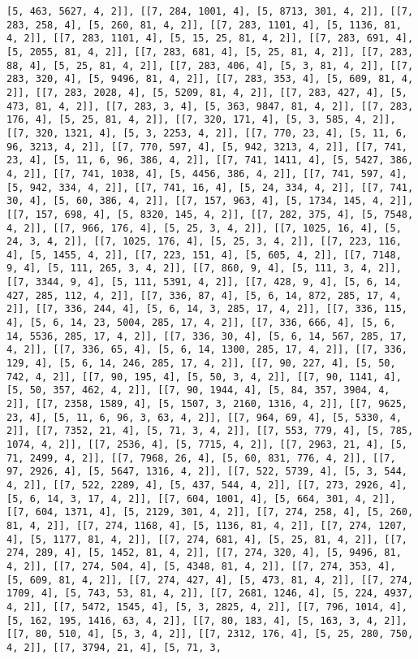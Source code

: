 \documentclass[12pt,fleqn]{article}\usepackage{../../common}
\begin{document}
\begin{verbatim}
[5, 463, 5627, 4, 2]], [[7, 284, 1001, 4], [5, 8713, 301, 4, 2]], [[7, 283, 258, 4], [5, 260, 81, 4, 2]], [[7, 283, 1101, 4], [5, 1136, 81, 4, 2]], [[7, 283, 1101, 4], [5, 15, 25, 81, 4, 2]], [[7, 283, 691, 4], [5, 2055, 81, 4, 2]], [[7, 283, 681, 4], [5, 25, 81, 4, 2]], [[7, 283, 88, 4], [5, 25, 81, 4, 2]], [[7, 283, 406, 4], [5, 3, 81, 4, 2]], [[7, 283, 320, 4], [5, 9496, 81, 4, 2]], [[7, 283, 353, 4], [5, 609, 81, 4, 2]], [[7, 283, 2028, 4], [5, 5209, 81, 4, 2]], [[7, 283, 427, 4], [5, 473, 81, 4, 2]], [[7, 283, 3, 4], [5, 363, 9847, 81, 4, 2]], [[7, 283, 176, 4], [5, 25, 81, 4, 2]], [[7, 320, 171, 4], [5, 3, 585, 4, 2]], [[7, 320, 1321, 4], [5, 3, 2253, 4, 2]], [[7, 770, 23, 4], [5, 11, 6, 96, 3213, 4, 2]], [[7, 770, 597, 4], [5, 942, 3213, 4, 2]], [[7, 741, 23, 4], [5, 11, 6, 96, 386, 4, 2]], [[7, 741, 1411, 4], [5, 5427, 386, 4, 2]], [[7, 741, 1038, 4], [5, 4456, 386, 4, 2]], [[7, 741, 597, 4], [5, 942, 334, 4, 2]], [[7, 741, 16, 4], [5, 24, 334, 4, 2]], [[7, 741, 30, 4], [5, 60, 386, 4, 2]], [[7, 157, 963, 4], [5, 1734, 145, 4, 2]], [[7, 157, 698, 4], [5, 8320, 145, 4, 2]], [[7, 282, 375, 4], [5, 7548, 4, 2]], [[7, 966, 176, 4], [5, 25, 3, 4, 2]], [[7, 1025, 16, 4], [5, 24, 3, 4, 2]], [[7, 1025, 176, 4], [5, 25, 3, 4, 2]], [[7, 223, 116, 4], [5, 1455, 4, 2]], [[7, 223, 151, 4], [5, 605, 4, 2]], [[7, 7148, 9, 4], [5, 111, 265, 3, 4, 2]], [[7, 860, 9, 4], [5, 111, 3, 4, 2]], [[7, 3344, 9, 4], [5, 111, 5391, 4, 2]], [[7, 428, 9, 4], [5, 6, 14, 427, 285, 112, 4, 2]], [[7, 336, 87, 4], [5, 6, 14, 872, 285, 17, 4, 2]], [[7, 336, 244, 4], [5, 6, 14, 3, 285, 17, 4, 2]], [[7, 336, 115, 4], [5, 6, 14, 23, 5004, 285, 17, 4, 2]], [[7, 336, 666, 4], [5, 6, 14, 5536, 285, 17, 4, 2]], [[7, 336, 30, 4], [5, 6, 14, 567, 285, 17, 4, 2]], [[7, 336, 65, 4], [5, 6, 14, 1300, 285, 17, 4, 2]], [[7, 336, 129, 4], [5, 6, 14, 246, 285, 17, 4, 2]], [[7, 90, 227, 4], [5, 50, 742, 4, 2]], [[7, 90, 195, 4], [5, 50, 3, 4, 2]], [[7, 90, 1141, 4], [5, 50, 357, 462, 4, 2]], [[7, 90, 1944, 4], [5, 84, 357, 3904, 4, 2]], [[7, 2358, 1589, 4], [5, 1507, 3, 2160, 1316, 4, 2]], [[7, 9625, 23, 4], [5, 11, 6, 96, 3, 63, 4, 2]], [[7, 964, 69, 4], [5, 5330, 4, 2]], [[7, 7352, 21, 4], [5, 71, 3, 4, 2]], [[7, 553, 779, 4], [5, 785, 1074, 4, 2]], [[7, 2536, 4], [5, 7715, 4, 2]], [[7, 2963, 21, 4], [5, 71, 2499, 4, 2]], [[7, 7968, 26, 4], [5, 60, 831, 776, 4, 2]], [[7, 97, 2926, 4], [5, 5647, 1316, 4, 2]], [[7, 522, 5739, 4], [5, 3, 544, 4, 2]], [[7, 522, 2289, 4], [5, 437, 544, 4, 2]], [[7, 273, 2926, 4], [5, 6, 14, 3, 17, 4, 2]], [[7, 604, 1001, 4], [5, 664, 301, 4, 2]], [[7, 604, 1371, 4], [5, 2129, 301, 4, 2]], [[7, 274, 258, 4], [5, 260, 81, 4, 2]], [[7, 274, 1168, 4], [5, 1136, 81, 4, 2]], [[7, 274, 1207, 4], [5, 1177, 81, 4, 2]], [[7, 274, 681, 4], [5, 25, 81, 4, 2]], [[7, 274, 289, 4], [5, 1452, 81, 4, 2]], [[7, 274, 320, 4], [5, 9496, 81, 4, 2]], [[7, 274, 504, 4], [5, 4348, 81, 4, 2]], [[7, 274, 353, 4], [5, 609, 81, 4, 2]], [[7, 274, 427, 4], [5, 473, 81, 4, 2]], [[7, 274, 1709, 4], [5, 743, 53, 81, 4, 2]], [[7, 2681, 1246, 4], [5, 224, 4937, 4, 2]], [[7, 5472, 1545, 4], [5, 3, 2825, 4, 2]], [[7, 796, 1014, 4], [5, 162, 195, 1416, 63, 4, 2]], [[7, 80, 183, 4], [5, 163, 3, 4, 2]], [[7, 80, 510, 4], [5, 3, 4, 2]], [[7, 2312, 176, 4], [5, 25, 280, 750, 4, 2]], [[7, 3794, 21, 4], [5, 71, 3, 
\end{verbatim}
\end{document}
